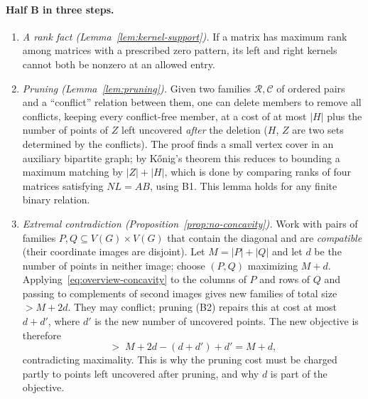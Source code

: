 \documentclass[11pt]{article}
\theoremstyle{remark}
\newcommand{\abs}[1]{\lvert #1\rvert}
\begin{document}
\paragraph{Half B in three steps.}
\begin{enumerate}[label=\textbf{B\arabic*.},leftmargin=3em]
\item \emph{A rank fact (Lemma~\ref{lem:kernel-support}).} If a matrix has
maximum rank among matrices with a prescribed zero pattern, its left and right
kernels cannot both be nonzero at an allowed entry.
\item \emph{Pruning (Lemma~\ref{lem:pruning}).} Given two families
$\mathcal R,\mathcal C$ of ordered pairs and a ``conflict'' relation between
them, one can delete members to remove all conflicts, keeping every
conflict-free member, at a cost of at most $\abs H$ plus the number of points
of $Z$ left uncovered \emph{after} the deletion ($H$, $Z$ are two sets
determined by the conflicts). The proof finds a small vertex cover in an
auxiliary bipartite graph; by K\H{o}nig's theorem this reduces to bounding a
maximum matching by $\abs Z+\abs H$, which is done by comparing ranks of four
matrices satisfying $NL=AB$, using B1. This lemma holds for any finite binary
relation.
\item \emph{Extremal contradiction (Proposition~\ref{prop:no-concavity}).}
Work with pairs of families $P,Q\subseteq V(G)\times V(G)$ that contain the
diagonal and are \emph{compatible} (their coordinate images are disjoint).
Let $M=\abs P+\abs Q$ and let $d$ be the number of points in neither image;
choose $(P,Q)$ maximizing $M+d$. Applying~\eqref{eq:overview-concavity} to
the columns of $P$ and rows of $Q$ and passing to complements of second
images gives new families of total size $>M+2d$. They may conflict; pruning
(B2) repairs this at cost at most $d+d'$, where $d'$ is the new number of
uncovered points. The new objective is therefore
\[
 >\;M+2d-(d+d')+d'=M+d ,
\]
contradicting maximality. This is why the pruning cost must be charged partly
to points left uncovered after pruning, and why $d$ is part of the objective.
\end{enumerate}
\end{document}
